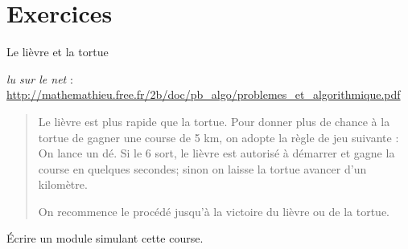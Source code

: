 
\clearpage
\section{Exercices}

\begin{Exercice}{Le lièvre et la tortue}

	\emph{lu sur le net} :
	{\footnotesize \url{http://mathemathieu.free.fr/2b/doc/pb_algo/problemes_et_algorithmique.pdf}}
	
	\begin{quote}
	\og{}Le lièvre est plus rapide que la tortue.
	Pour donner plus de chance à la tortue de gagner une course de 5 km, 
	on adopte la règle de jeu suivante :
	On lance un dé. 
	Si le 6 sort, le lièvre est autorisé à démarrer et gagne la course en quelques
	secondes; sinon on laisse la tortue avancer d’un kilomètre.
	
	On recommence le procédé jusqu'à la victoire du lièvre ou de la tortue.\fg{}
	\end{quote}
	
	Écrire un module simulant cette course.
\end{Exercice}


